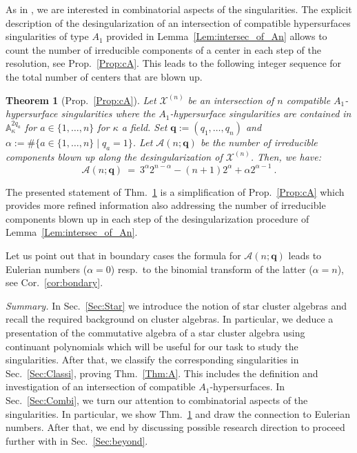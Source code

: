 \documentclass[letter,11pt]{amsart}
\renewcommand{\AA}{\ensuremath{\mathbb{A}}}
\newcommand{\cA}{\mathcal{A}}
\newcommand{\cX}{\mathcal{X}}
\newcommand{\q}{\boldsymbol{q}}
\newcounter{CountAlpha}
\theoremstyle{theorem}
\newtheorem{MainThm}[CountAlpha]{Theorem}  %
\theoremstyle{definition}
\numberwithin{equation}{section}
\begin{document}



As in \cite{BFMS23}, we are interested in combinatorial aspects of the singularities. 
The explicit description of the desingularization of an intersection of compatible hypersurfaces singularities of type $ A_1 $ provided in Lemma~\ref{Lem:intersec_of_An}
allows to count the number of irreducible components of a center in each step of the resolution, see Prop.~\ref{Prop:cA}.
This leads to the following integer sequence for the total number of centers that are blown up.

 
\begin{MainThm}[Prop.~\ref{Prop:cA}]
	\label{Thm:B}
	Let $ \cX^{(n)} $ be an intersection of $ n $ compatible $ A_1 $-hypersurface singularities
	where the $ A_1 $-hypersurface singularities are contained in $ \AA_\kappa^{2 q_a} $ for $  a \in \{ 1, \ldots, n \} $
	for $ \kappa $ a field. 
	Set $ \q := (q_1, \ldots, q_n) $
	and $ \alpha := \# \{ a \in \{ 1, \ldots, n \} \mid q_a = 1 \} $. 
	Let $ \mathcal{A} (n;\q) $ be the number of irreducible components blown up along the desingularization of 
	$  \cX^{(n)} $. 
	Then, we have: 
	\[
	\mathcal{A} (n;\q) 
	\ = \ 
	3^\alpha 2^{n-\alpha}  
	- ( n + 1) 2^{\alpha} 
	+ \alpha 2^{\alpha - 1}
	\ .
	\]
\end{MainThm}

The presented statement of Thm.~\ref{Thm:B} is a simplification of Prop.~\ref{Prop:cA} which provides more refined information also addressing the number of irreducible components blown up in each step of the desingularization procedure of Lemma~\ref{Lem:intersec_of_An}. 


Let us point out that in boundary cases the formula for $ \cA(n;\q) $ leads to Eulerian numbers ($ \alpha = 0 $) resp.~to the binomial transform of the latter ($ \alpha = n $),
see Cor.~\ref{cor:bondary}.









{\em Summary.}
In Sec.~\ref{Sec:Star} we introduce the notion of star cluster algebras and recall the required background on cluster algebras. 
In particular, we deduce a presentation of the commutative algebra of a star cluster algebra using continuant polynomials 
which will be useful for our task to study the singularities. 
After that, we classify the corresponding singularities in Sec.~\ref{Sec:Classi}, proving Thm.~\ref{Thm:A}.
This includes the definition and investigation of an intersection of compatible $ A_1 $-hypersurfaces. 
In Sec.~\ref{Sec:Combi}, we turn our attention to combinatorial aspects of the singularities.
In particular, we show Thm.~\ref{Thm:B} and draw the connection to Eulerian numbers.
After that, we end by discussing possible research direction to proceed further with in Sec.~\ref{Sec:beyond}. 
\end{document}
